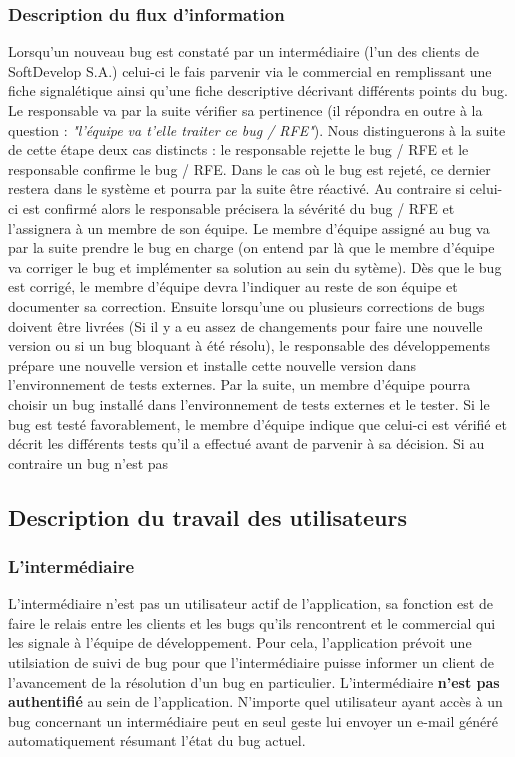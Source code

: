 \documentclass{article}[12pt]
\begin{document}
\subsubsection{Description du flux d'information}
Lorsqu'un nouveau bug est constaté par un intermédiaire (l'un des clients de SoftDevelop S.A.) celui-ci le fais parvenir via le commercial en remplissant une fiche signalétique ainsi qu'une fiche descriptive décrivant différents points du bug. Le responsable va par la suite vérifier sa pertinence (il répondra en outre à la question : \emph{"l'équipe va t'elle traiter ce bug / RFE"}). 
\newline
\newline
Nous distinguerons à la suite de cette étape deux cas distincts : le responsable rejette le bug / RFE et le responsable confirme le bug / RFE. Dans le cas où le bug est rejeté, ce dernier restera dans le système et pourra par la suite être réactivé. Au contraire si celui-ci est confirmé alors le responsable précisera la sévérité du bug / RFE et l'assignera à un membre de son équipe. Le membre d'équipe assigné au bug va par la suite prendre le bug en charge (on entend par là que le membre d'équipe va corriger le bug et implémenter sa solution au sein du sytème). 
\newline
\newline
Dès que le bug est corrigé, le membre d'équipe devra l'indiquer au reste de son équipe et documenter sa correction. Ensuite lorsqu'une ou plusieurs corrections de bugs doivent être livrées (Si il y a eu assez de changements pour faire une nouvelle version ou si un bug bloquant à été résolu), le responsable des développements prépare une nouvelle version et installe cette nouvelle version dans l'environnement de tests externes. Par la suite, un membre d'équipe pourra choisir un bug installé dans l'environnement de tests externes et le tester. Si le bug est testé favorablement, le membre d'équipe indique que celui-ci est vérifié et décrit les différents tests qu'il a effectué avant de parvenir à sa décision. Si au contraire un bug n'est pas 
\subsection{Description du travail des utilisateurs}
\subsubsection{L'intermédiaire}
L'intermédiaire n'est pas un utilisateur actif de l'application, sa fonction est de faire le relais entre les clients et les bugs qu'ils rencontrent et le commercial qui les signale à l'équipe de développement. Pour cela, l'application prévoit une utilsiation de suivi de bug pour que l'intermédiaire puisse informer un client de l'avancement de la résolution d'un bug en particulier. L'intermédiaire  \textbf{ n'est pas authentifié} au sein de l'application. N'importe quel utilisateur ayant accès à un bug concernant un intermédiaire peut en seul geste lui envoyer un e-mail généré automatiquement résumant l'état du bug actuel.
\end{document}
